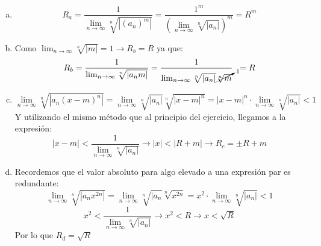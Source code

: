 \documentclass[12pt,a4paper,oneside,onecolumn]{article}
\begin{document}
    \begin{enumerate}[a)]
        \item
        \[
            R_a = \frac{1}{\lim_{n\to\infty}{\sqrt[n]{|(a_n)^m|}}} =  \frac{1^m}{(\lim_{n\to\infty}{\sqrt[n]{|a_n|}})^m} = R^m
        \]
        \item
        Como $\lim_{n\to\infty}{\sqrt[n]{|m|}} = 1 \rightarrow R_b = R$ ya que:
        \[
            R_b = \frac{1}{\lim_{n\to\infty}{\sqrt[n]{|a_n m|}}} = \frac{1}{\lim_{n\to\infty}{\sqrt[n]{|a_n|}\cancelto{1}{\sqrt[n]{m}}}} \;\; = R
        \]
        \item
        \[
            \lim_{n\to\infty}{\sqrt[n]{|a_n(x-m)^n|}} = \lim_{n\to\infty}{\sqrt[n]{|a_n|}\sqrt[n]{|x-m|^n}} =
            |x-m|^n \cdot\lim_{n\to\infty}{\sqrt[n]{|a_n|}}<1
        \]
        Y utilizando el mismo m\'etodo que al principio del ejercicio, llegamos a la expresi\'on:
        \[
           |x - m| < \frac{1}{\lim_{n\to\infty}{\sqrt[n]{|a_n|}}} \longrightarrow |x| < |R + m| \longrightarrow R_c = \pm R + m
        \]
        
        \item
        Recordemos que el valor absoluto para algo elevado a una expresi\'on par es redundante:
        \[
            \lim_{n\to\infty}{\sqrt[n]{|a_n x^{2n}|}} = \lim_{n\to\infty}{\sqrt[n]{|a_n}\sqrt[n]{x^{2n}}} = 
            x^2 \cdot \lim_{n\to\infty}{\sqrt[n]{|a_n|}}< 1
        \]
        \[
            x^2 < \frac{1}{\lim_{n\to\infty}{\sqrt[n]{|a_n|}}} \longrightarrow x^2 < R \longrightarrow x < \sqrt{R}
        \]
        Por lo que $R_d = \sqrt{R}$
    \end{enumerate}
\end{document}

